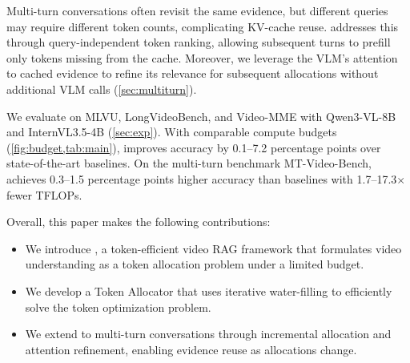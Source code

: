  Multi-turn conversations often revisit the same evidence, but different queries may require different token counts, complicating KV-cache reuse. \name addresses this through query-independent token ranking, allowing subsequent turns to prefill only tokens missing from the cache. Moreover, we leverage the VLM's attention to cached evidence to refine its relevance for subsequent allocations without additional VLM calls (\cref{sec:multiturn}).



We evaluate \name on MLVU, LongVideoBench, and Video-MME with
Qwen3-VL-8B and InternVL3.5-4B (\cref{sec:exp}).
With comparable compute budgets (\cref{fig:budget,tab:main}), \name improves accuracy by 0.1--7.2 percentage points
over state-of-the-art baselines.
On the multi-turn benchmark MT-Video-Bench, \name achieves 0.3--1.5 percentage points higher accuracy than baselines
with 1.7--17.3$\times$ fewer TFLOPs.


 Overall, this paper makes the following contributions:
\begin{itemize}
  \item We introduce \name, a token-efficient video RAG framework that 
  formulates video understanding as a token allocation problem under a limited budget.
  \item We develop a Token Allocator that uses iterative water-filling to efficiently solve the token optimization problem.
  \item We extend \name to multi-turn conversations through incremental allocation and attention refinement, enabling evidence reuse as allocations change.
\end{itemize}




